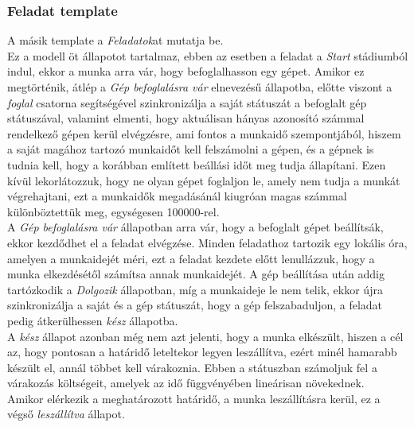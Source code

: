 \documentclass [12pt]{report}
\begin{document}
    \subsubsection*{Feladat template}
    A másik template a \emph{Feladatok}at mutatja be.\\
    Ez a modell öt állapotot tartalmaz, ebben az esetben a feladat a \emph{Start} stádiumból indul, ekkor a munka arra vár, hogy befoglalhasson egy gépet. Amikor ez megtörténik, átlép a \emph{Gép befoglalásra vár} elnevezésű állapotba, előtte viszont a \emph{foglal} csatorna segítségével szinkronizálja a saját státuszát a befoglalt gép státuszával, valamint elmenti, hogy aktuálisan hányas azonosító számmal rendelkező gépen kerül elvégzésre, ami fontos a munkaidő szempontjából, hiszem a saját magához tartozó munkaidőt kell felszámolni a gépen, és a gépnek is tudnia kell, hogy a korábban említett beállási időt meg tudja állapítani. Ezen kívül lekorlátozzuk, hogy ne olyan gépet foglaljon le, amely nem tudja a munkát végrehajtani, ezt a munkaidők megadásánál kiugróan magas számmal különböztettük meg, egységesen 100000-rel. \\
    A \emph{Gép befoglalásra vár} állapotban arra vár, hogy a befoglalt gépet beállítsák, ekkor kezdődhet el a feladat elvégzése. Minden feladathoz tartozik egy lokális óra, amelyen a munkaidejét méri, ezt a feladat kezdete előtt lenullázzuk, hogy a munka elkezdésétől számítsa annak munkaidejét. A gép beállítása után addig tartózkodik a \emph{Dolgozik} állapotban, míg a munkaideje le nem telik, ekkor újra szinkronizálja a saját és a gép státuszát, hogy a gép felszabaduljon, a feladat pedig átkerülhessen \emph{kész} állapotba. \\
    A \emph{kész} állapot azonban még nem azt jelenti, hogy a munka elkészült, hiszen a cél az, hogy pontosan a határidő leteltekor legyen leszállítva, ezért minél hamarabb készült el, annál többet kell várakoznia. Ebben a státuszban számoljuk fel a várakozás költségeit, amelyek az idő függvényében lineárisan növekednek. \\
    Amikor elérkezik a meghatározott határidő, a munka leszállításra kerül, ez a végső \emph{leszállítva} állapot.  
\end{document}
